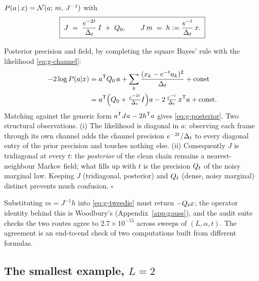 \begin{proposition}\label{prop:g-posterior}
$P(a \,|\, x) = \mathcal{N}(a;\, m,\, J^{-1})$ with
\begin{equation}
  \boxed{\;
  J \;=\; \frac{e^{-2t}}{\Delta_t}\, I \;+\; Q_0 ,
  \qquad
  J\, m \;=\; h := \frac{e^{-t}}{\Delta_t}\, x .
  \;}
  \label{eq:g-posterior}
\end{equation}
\end{proposition}

\begin{toolbox}{Posterior precision and field, by completing the square}
Bayes' rule with the likelihood \eqref{eq:g-channel}:
\begin{align*}
  -2 \log P(a | x)
  &= a^{\mathsf{T}} Q_0\, a
  + \sum_{k} \frac{(x_k - e^{-t} a_k)^2}{\Delta_t}
  + \text{const} \\
  &= a^{\mathsf{T}} \Big( Q_0 + \tfrac{e^{-2t}}{\Delta_t} I \Big) a
  - 2\, \tfrac{e^{-t}}{\Delta_t}\, x^{\mathsf{T}} a
  + \text{const}.
\end{align*}
Matching against the generic form $a^{\mathsf{T}} J a - 2 h^{\mathsf{T}} a$ gives
\eqref{eq:g-posterior}. Two structural observations. (i) The likelihood is
diagonal in $a$: observing each frame through its own channel adds the
channel precision $e^{-2t}/\Delta_t$ to every diagonal entry of the prior
precision and touches nothing else. (ii) Consequently $J$ is tridiagonal
at every $t$: the \emph{posterior} of the clean chain remains a
nearest-neighbour Markov field; what fills up with $t$ is the precision
$Q_t$ of the noisy marginal law. Keeping $J$ (tridiagonal, posterior) and
$Q_t$ (dense, noisy marginal) distinct prevents much confusion.
\hfill$\square$
\end{toolbox}

Substituting $m = J^{-1} h$ into \eqref{eq:g-tweedie} must return
$-Q_t x$; the operator identity behind this is Woodbury's
(Appendix~\ref{app:gauss}), and the audit suite checks the two routes
agree to $2.7 \times 10^{-15}$ across sweeps of $(L, \alpha, t)$. The
agreement is an end-to-end check of two computations built from different
formulas.

\subsection{The smallest example, $L = 2$}\label{sec:g-K2}

